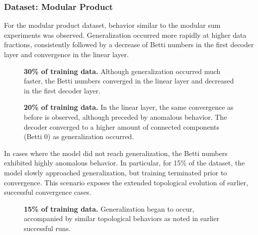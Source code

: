 \subsubsection{Dataset: Modular Product}

For the modular product dataset, behavior similar to the modular sum experiments was observed. Generalization occurred more rapidly at higher data fractions, consistently followed by a decrease of Betti numbers in the first decoder layer and convergence in the linear layer.

\begin{figure}
    \centering
    
    
    \caption[30\% of training data (Modular Product).]{\textbf{30\% of training data.} Although generalization occurred much faster, the Betti numbers converged in the linear layer and decreased in the first decoder layer.}
    \label{fig:prod-decoder0-linear-30pct}
\end{figure}

\begin{figure}
    \centering
    
    
    \caption[20\% of training data (Modular Product).]{\textbf{20\% of training data.} In the linear layer, the same convergence as before is observed, although preceded by anomalous behavior. The decoder converged to a higher amount of connected components (Betti 0) as generalization occurred.}
    \label{fig:prod-decoder0-linear-20pct}
\end{figure}

In cases where the model did not reach generalization, the Betti numbers exhibited highly anomalous behavior. In particular, for 15\% of the dataset, the model slowly approached generalization, but training terminated prior to convergence. This scenario exposes the extended topological evolution of earlier, successful convergence cases.  

\begin{figure}[htbp]
    \centering
    
    
    \caption[15\% of training data (Modular Product).]{\textbf{15\% of training data.} Generalization began to occur, accompanied by similar topological behaviors as noted in earlier successful runs.}
    \label{fig:prod-decoder0-linear-15pct}
\end{figure}

